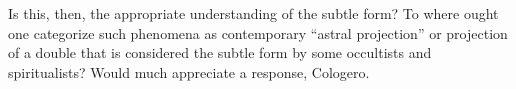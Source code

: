 \begin{footnotesize}
\begin{sffamily}
Is this, then, the appropriate understanding of the subtle form? To where ought one categorize such phenomena as contemporary ``astral projection'' or projection of a double that is considered the subtle form by some occultists and spiritualists? Would much appreciate a response, Cologero.

\end{sffamily}
\end{footnotesize}

